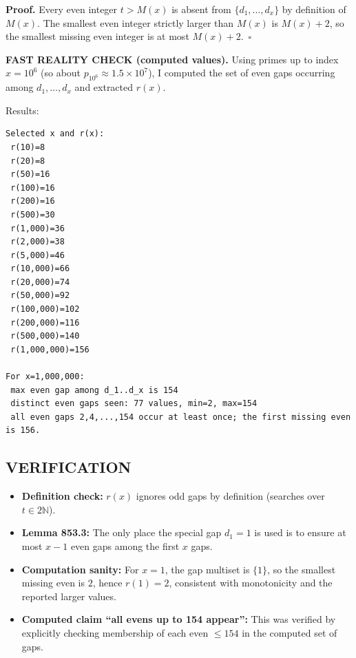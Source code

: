 \textbf{Proof.}
Every even integer $t>M(x)$ is absent from $\{d_1,\dots,d_x\}$ by definition of $M(x)$. The smallest even integer strictly larger than $M(x)$ is $M(x)+2$, so the smallest missing even integer is at most $M(x)+2$.\ $\square$

\medskip
\textbf{FAST REALITY CHECK (computed values).}
Using primes up to index $x=10^6$ (so about $p_{10^6}\approx 1.5\times 10^7$), I computed the set of even gaps occurring among $d_1,\dots,d_x$ and extracted $r(x)$.

Results:
\begin{verbatim}
Selected x and r(x):
 r(10)=8
 r(20)=8
 r(50)=16
 r(100)=16
 r(200)=16
 r(500)=30
 r(1,000)=36
 r(2,000)=38
 r(5,000)=46
 r(10,000)=66
 r(20,000)=74
 r(50,000)=92
 r(100,000)=102
 r(200,000)=116
 r(500,000)=140
 r(1,000,000)=156

For x=1,000,000:
 max even gap among d_1..d_x is 154
 distinct even gaps seen: 77 values, min=2, max=154
 all even gaps 2,4,...,154 occur at least once; the first missing even is 156.
\end{verbatim}

\subsection*{VERIFICATION}
\begin{itemize}
\item \textbf{Definition check:} $r(x)$ ignores odd gaps by definition (searches over $t\in 2\mathbb{N}$).
\item \textbf{Lemma 853.3:} The only place the special gap $d_1=1$ is used is to ensure at most $x-1$ even gaps among the first $x$ gaps.
\item \textbf{Computation sanity:} For $x=1$, the gap multiset is $\{1\}$, so the smallest missing even is $2$, hence $r(1)=2$, consistent with monotonicity and the reported larger values.
\item \textbf{Computed claim ``all evens up to 154 appear'':} This was verified by explicitly checking membership of each even $\le 154$ in the computed set of gaps.
\end{itemize}

